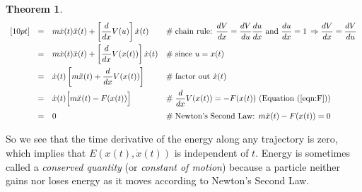 \documentclass{article}
\theoremstyle{definition}
\newtheorem{theorem}{Theorem}[section]
\begin{document}
\begin{theorem}
\begin{equation*}
\begin{array}{llll}
[10pt]
&=& m\dot{x}(t)\ddot{x}(t) + \left [ \dfrac{d}{dx}V(u) \right ] \dot{x}(t)
		&\hspace{0em} \mathrel{\#} \text{chain rule: $\dfrac{dV}{dx} = 
									     \dfrac{dV}{du} \dfrac{du}{dx}$ 
										 and 
										 $\dfrac{du}{dx} = 1
										 \, \Rightarrow
										 \dfrac{dV}{dx} = \dfrac{dV}{du}$}\\
[10pt]
&=& m\dot{x}(t)\ddot{x}(t) + \left [ \dfrac{d}{dx}V(x(t)) \right ] \dot{x}(t)
		&\hspace{0em} \mathrel{\#} \text{since $u = x(t)$} \\
[10pt]
&=& \dot{x}(t)\left [m \ddot{x}(t) + \dfrac{d}{dx}V(x(t)) \right ]
		&\hspace{0em} \mathrel{\#} \text{factor out $\dot{x}(t)$} \\
[10pt]
&=& \dot{x}(t)\Big [m \ddot{x}(t) - F(x(t)) \Big ]
		&\hspace{0em} \mathrel{\#} \text{$\dfrac{d}{dx}V(x(t)) = - F(x(t))$ 
		                                 (Equation (\ref{eqn:F}))} \\
[10pt]
&=& 0
		&\hspace{0em} \mathrel{\#} \text{Newton's Second Law: $m \ddot{x}(t) - F(x(t)) = 0$} 
\end{array}
\end{equation*}

\medskip
\noindent
So we see that the time derivative of the energy along any trajectory 
is zero, which implies that $E(x(t), \dot{x}(t))$ is independent of $t$. 
Energy is sometimes called a \emph{conserved quantity} (or \emph{constant 
of motion}) because a particle neither gains nor loses energy 
as it moves according to Newton’s Second Law.
\end{theorem}
%
%
% 
%
%
%
%
%
%
%
%
%
\end{document}
